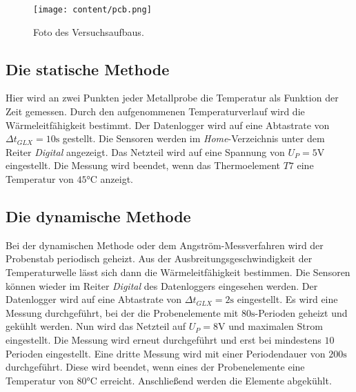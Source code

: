     \begin{figure}[H]
      \centering
      \texttt{[image: content/pcb.png]}
      \caption{Foto des Versuchsaufbaus.\cite{AP01}}
      \label{fig:aufbau}
    \end{figure}
    
    \subsection{Die statische Methode}
    \label{sec:statisch}
    Hier wird an zwei Punkten jeder Metallprobe die Temperatur als Funktion der Zeit
    gemessen. Durch den aufgenommenen Temperaturverlauf wird die Wärmeleitfähigkeit bestimmt.
    Der Datenlogger wird auf eine Abtastrate von $\Delta t_{GLX} = 10 \si{\second}$
    gestellt. Die Sensoren werden im \textit{Home}-Verzeichnis unter dem Reiter \textit{Digital}
    angezeigt. Das Netzteil wird auf eine Spannung von $U_P = 5 \si{\volt}$ eingestellt.
    Die Messung wird beendet, wenn das Thermoelement $T7$ eine Temperatur von $45 \si{\celsius}$
    anzeigt.
    
    \subsection{Die dynamische Methode}
    \label{sec:dynamisch}
    Bei der dynamischen Methode oder dem Angström-Messverfahren wird der Probenstab
    periodisch geheizt. Aus der Ausbreitungsgeschwindigkeit der Temperaturwelle lässt sich
    dann die Wärmeleitfähigkeit bestimmen. Die Sensoren können wieder im Reiter \textit{Digital}
    des Datenloggers eingesehen werden. Der Datenlogger wird auf eine Abtastrate von
    $\Delta t_{GLX} = 2 \si{\second}$ eingestellt. Es wird eine Messung durchgeführt,
    bei der die Probenelemente mit $80 \si{\second}$-Perioden geheizt und gekühlt werden.
    Nun wird das Netzteil auf $U_P = 8 \si{\volt}$ und maximalen Strom eingestellt.
    Die Messung wird erneut durchgeführt und erst bei mindestens $10$ Perioden eingestellt.
    Eine dritte Messung wird mit einer Periodendauer von $200 \si{\second}$ durchgeführt.
    Diese wird beendet, wenn eines der Probenelemente eine Temperatur von $80 \si{\celsius}$
    erreicht. Anschließend werden die Elemente abgekühlt.